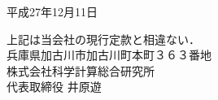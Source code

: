 \documentclass[11pt,a4paper]{jsarticle}
\begin{document}
\vspace{20pt}
\begin{flushright}
平成27年12月11日\\
\vspace{10pt}

上記は当会社の現行定款と相違ない．\\
\vspace{10pt}
兵庫県加古川市加古川町本町３６３番地\\
株式会社科学計算総合研究所\\
代表取締役 井原遊
\end{flushright}
\end{document}
